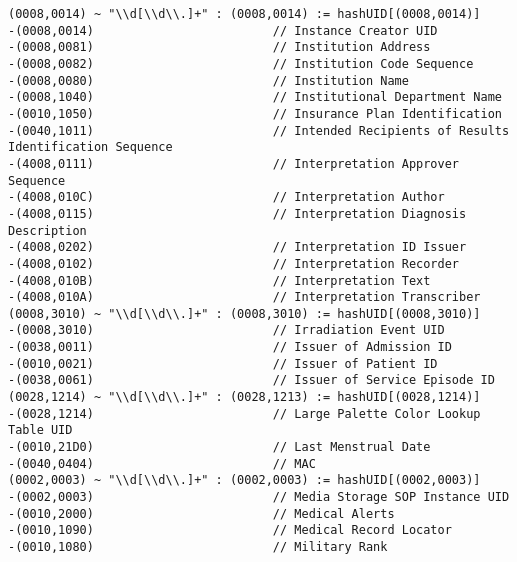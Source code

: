\documentclass{beamer}  %
\begin{document}
\begin{frame}[fragile]
\tiny
\begin{verbatim}
(0008,0014) ~ "\\d[\\d\\.]+" : (0008,0014) := hashUID[(0008,0014)]
-(0008,0014)                         // Instance Creator UID
-(0008,0081)                         // Institution Address
-(0008,0082)                         // Institution Code Sequence
-(0008,0080)                         // Institution Name
-(0008,1040)                         // Institutional Department Name
-(0010,1050)                         // Insurance Plan Identification
-(0040,1011)                         // Intended Recipients of Results Identification Sequence
-(4008,0111)                         // Interpretation Approver Sequence
-(4008,010C)                         // Interpretation Author
-(4008,0115)                         // Interpretation Diagnosis Description
-(4008,0202)                         // Interpretation ID Issuer
-(4008,0102)                         // Interpretation Recorder
-(4008,010B)                         // Interpretation Text
-(4008,010A)                         // Interpretation Transcriber
(0008,3010) ~ "\\d[\\d\\.]+" : (0008,3010) := hashUID[(0008,3010)]
-(0008,3010)                         // Irradiation Event UID
-(0038,0011)                         // Issuer of Admission ID
-(0010,0021)                         // Issuer of Patient ID
-(0038,0061)                         // Issuer of Service Episode ID
(0028,1214) ~ "\\d[\\d\\.]+" : (0028,1213) := hashUID[(0028,1214)]
-(0028,1214)                         // Large Palette Color Lookup Table UID
-(0010,21D0)                         // Last Menstrual Date
-(0040,0404)                         // MAC
(0002,0003) ~ "\\d[\\d\\.]+" : (0002,0003) := hashUID[(0002,0003)]
-(0002,0003)                         // Media Storage SOP Instance UID
-(0010,2000)                         // Medical Alerts
-(0010,1090)                         // Medical Record Locator
-(0010,1080)                         // Military Rank
\end{verbatim}
\end{frame}
\end{document}
